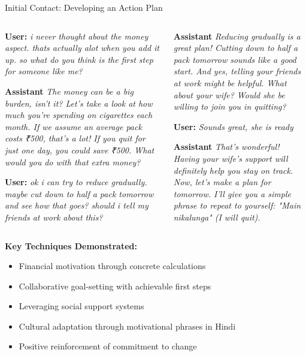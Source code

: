 \begin{frame}{Initial Contact: Developing an Action Plan}
  \begin{columns}
    \begin{column}{0.48\textwidth}
      \tiny
      \textbf{User:} \textit{i never thought about the money aspect. thats actually alot when you add it up. so what do you think is the first step for someone like me?}
      
      \vspace{0.2cm}
      \textbf{Assistant} \textit{The money can be a big burden, isn't it? Let's take a look at how much you're spending on cigarettes each month. If we assume an average pack costs ₹500, that's a lot! If you quit for just one day, you could save ₹500. What would you do with that extra money?}
      
      \vspace{0.2cm}
      \textbf{User:} \textit{ok i can try to reduce gradually. maybe cut down to half a pack tomorrow and see how that goes? should i tell my friends at work about this?}
    \end{column}
    
    \begin{column}{0.48\textwidth}
      \footnotesize
      \textbf{Assistant} \textit{Reducing gradually is a great plan! Cutting down to half a pack tomorrow sounds like a good start. And yes, telling your friends at work might be helpful. What about your wife? Would she be willing to join you in quitting?}
      
      \vspace{0.2cm}
      \textbf{User:} \textit{Sounds great, she is ready}
      
      \vspace{0.2cm}
      \textbf{Assistant} \textit{That's wonderful! Having your wife's support will definitely help you stay on track. Now, let's make a plan for tomorrow. I'll give you a simple phrase to repeat to yourself: "Main nikalunga" (I will quit).}
    \end{column}
  \end{columns}
  
  \vspace{0.3cm}
  \footnotesize
  \textbf{Key Techniques Demonstrated:}
  \begin{itemize}
    \item Financial motivation through concrete calculations
    \item Collaborative goal-setting with achievable first steps
    \item Leveraging social support systems
    \item Cultural adaptation through motivational phrases in Hindi
    \item Positive reinforcement of commitment to change
  \end{itemize}
\end{frame}